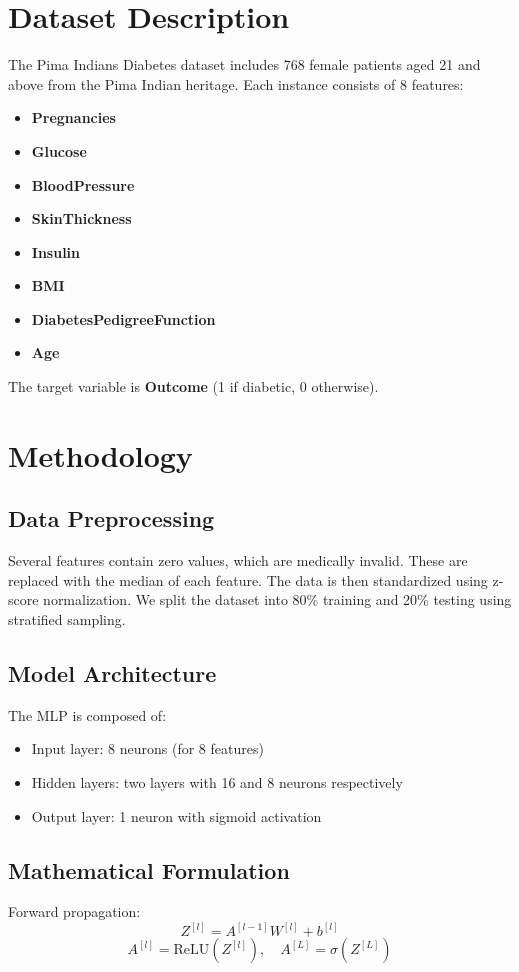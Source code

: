 \documentclass[12pt]{article}
\begin{document}
\section{Dataset Description}
The Pima Indians Diabetes dataset includes 768 female patients aged 21 and above from the Pima Indian heritage. Each instance consists of 8 features:
\begin{itemize}
    \item \textbf{Pregnancies}
    \item \textbf{Glucose}
    \item \textbf{BloodPressure}
    \item \textbf{SkinThickness}
    \item \textbf{Insulin}
    \item \textbf{BMI}
    \item \textbf{DiabetesPedigreeFunction}
    \item \textbf{Age}
\end{itemize}
The target variable is \textbf{Outcome} (1 if diabetic, 0 otherwise).

\section{Methodology}
\subsection{Data Preprocessing}
Several features contain zero values, which are medically invalid. These are replaced with the median of each feature. The data is then standardized using z-score normalization. We split the dataset into 80\% training and 20\% testing using stratified sampling.

\subsection{Model Architecture}
The MLP is composed of:
\begin{itemize}
    \item Input layer: 8 neurons (for 8 features)
    \item Hidden layers: two layers with 16 and 8 neurons respectively
    \item Output layer: 1 neuron with sigmoid activation
\end{itemize}

\subsection{Mathematical Formulation}
Forward propagation:
\[
Z^{[l]} = A^{[l-1]}W^{[l]} + b^{[l]}
\]
\[
A^{[l]} = \text{ReLU}(Z^{[l]}), \quad A^{[L]} = \sigma(Z^{[L]})
\]
\end{document}
